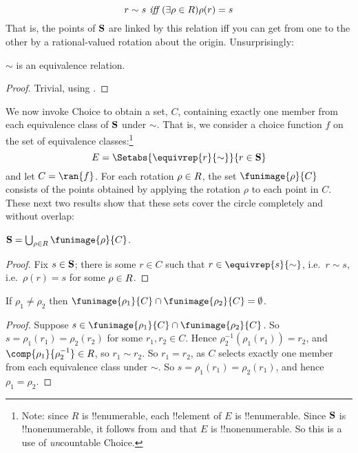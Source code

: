 \documentclass[../../../include/open-logic-section]{subfiles}
\begin{document}
	$$r \sim s \emph{ iff }(\exists \rho \in R)\rho(r) = s$$
That is, the points of $\mathbf{S}$ are linked by this relation iff you can get from one to the other by a rational-valued rotation about the origin. Unsurprisingly:
\begin{lem}$\sim$ is an equivalence relation.
\end{lem}
\begin{proof}
	Trivial, using . 
\end{proof}\noindent
We now invoke Choice to obtain a set, $C$, containing exactly one member from each equivalence class of $\mathbf{S}$ under $\sim$. That is, we consider a choice function $f$ on the set of equivalence classes:\footnote{Note: since $R$ is !!{enumerable}, each !!{element} of $E$ is !!{enumerable}. Since $\mathbf{S}$ is !!{nonenumerable}, it follows from  and  that $E$ is !!{nonenumerable}. So this is a use of \emph{un}countable Choice.}
	$$E = \Setabs{\equivrep{r}{\sim}}{r \in \onesphere}$$
and  let $C = \ran{f}$. For each rotation $\rho \in R$, the set $\funimage{\rho}{C}$ consists of the points obtained by applying the rotation $\rho$ to each point in $C$. These next two results show that these sets cover the circle completely and without overlap:
\begin{lem}	$\onesphere = \bigcup_{\rho \in \rotationsgroup} \funimage{\rho}{C}$.
\end{lem}\noindent
\begin{proof}
	Fix $s \in \mathbf{S}$; there is some $r \in C$ such that $r \in \equivrep{s}{\sim}$, i.e.\ $r \sim s$, i.e.\ $\rho(r) = s$ for some $\rho \in R$. 
	\end{proof}
\begin{lem} If $\rho_1 \neq \rho_2$ then $\funimage{\rho_1}{C} \cap \funimage{\rho_2}{C} = \emptyset$. 
\end{lem}
\begin{proof}
	Suppose $s \in \funimage{\rho_{1}}{C} \cap \funimage{\rho_{2}}{C}$. So $s = \rho_{1}(r_{1}) = \rho_{2}(r_{2})$ for some $r_{1}, r_{2} \in C$. Hence $\rho^{-1}_2(\rho_1(r_1)) = r_2$, and $\comp{\rho_1}{\rho^{-1}_2} \in \rotationsgroup$, so $r_{1} \sim r_{2}$. So $r_1 = r_2$, as $C$ selects exactly one member from each equivalence class under $\sim$. So $s = \rho_1(r_1) = \rho_2(r_1)$, and hence $\rho_1 = \rho_2$.
\end{proof}\noindent
\end{document}
